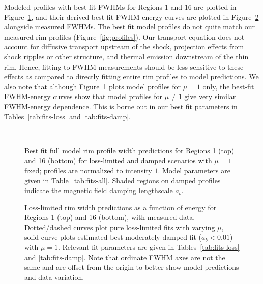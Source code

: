 \documentclass[iop, apj, numberedappendix]{emulateapj}
\begin{document}
Modeled profiles with best fit FWHMs for Regions 1 and 16 are plotted in
Figure~\ref{fig:rims}, and their derived best-fit FWHM-energy curves
are plotted in Figure~\ref{fig:fits} alongside measured FWHMs.
The best fit model profiles do not quite match our measured rim profiles
(Figure~\ref{fig:profiles}).  Our transport equation does not account for
diffusive transport upstream of the shock, projection effects from shock
ripples or other structure, and thermal emission downstream of the thin rim.
Hence, fitting to FWHM measurements should be less sensitive to these effects
as compared to directly fitting entire rim profiles to model predictions.
We also note that although Figure~\ref{fig:rims} plots model profiles for
$\mu = 1$ only, the best-fit FWHM-energy curves show that model profiles for
$\mu \neq 1$ give very similar FWHM-energy dependence.  This is borne out in
our best fit parameters in Tables~\ref{tab:fits-loss} and \ref{tab:fits-damp}.

\begin{figure}
    \centering
    \iftoggle{manuscript}{
        \epsscale{0.5}
    }{}
     \\
    \caption{Best fit full model rim profile width predictions for Regions 1
        (top) and 16 (bottom) for loss-limited and damped scenarios with
        $\mu = 1$ fixed; profiles are normalized to intensity $1$.  Model
        parameters are given in Table~\ref{tab:fits-all}.  Shaded regions on
        damped profiles indicate the magnetic field damping lengthscale $a_b$.
        \label{fig:rims}}
\end{figure}

\begin{figure}
    \centering
    \iftoggle{manuscript}{
        \texttt{[image: figures/energywidth-01.pdf]}
        \texttt{[image: figures/energywidth-16.pdf]}
    }{
        \texttt{[image: figures/energywidth-01.pdf]}
        \texttt{[image: figures/energywidth-16.pdf]}
    }
    \caption{Loss-limited rim width predictions as a function of energy for
    Regions 1 (top) and 16 (bottom), with measured data.  Dotted/dashed curves
    plot pure loss-limited fits with varying $\mu$, solid curve plots estimated
    best moderately damped fit ($a_b < 0.01$) with $\mu = 1$.  Relevant fit
    parameters are given in Tables~\ref{tab:fits-loss} and \ref{tab:fits-damp}.
    Note that ordinate FWHM axes are not the same and are offset from the
    origin to better show model predictions and data variation.
    \label{fig:fits}}
\end{figure}
\end{document}
